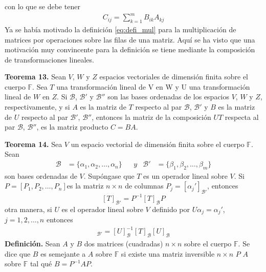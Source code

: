 \newpage
con lo que se debe tener
\begin{align}\label{eq:defi_mul}
    C_{ij}=\sum_{k=1}^{m}B_{ik}A_{kj}
\end{align}
Ya se había motivado la deﬁnición \eqref{eq:defi_mul} para la
multiplicación de matrices por operaciones sobre las ﬁlas de
una matriz. Aquí se ha visto que una motivación muy convincente
para la deﬁnición se tiene mediante la composición de
transformaciones lineales.

\textbf{Teorema 13.} Sean $V$, $W$ y $Z$ espacios vectoriales de
dimensión finita sobre el cuerpo $\mathbb{F}$. Sea $T$ una
transformación lineal de V en W y U una transformación lineal
de $W$ en $Z$. Si $\mathcal{B}$, $\mathcal{B}'$ y $\mathcal{B}''$
son las bases ordenadas de los espacios $V$, $W$ y $Z$,
respectivamente, y si $A$ es la matriz de $T$ respecto al par
$\mathcal{B}$, $\mathcal{B}'$ y $B$ es la matriz de $U$ respecto
al par $\mathcal{B}'$, $\mathcal{B}''$, entonces la matriz de
la composición $UT$ respecta al par $\mathcal{B}$, $\mathcal{B}''$,
es la matriz producto $C = BA$.

\textbf{Teorema 14.} Sea $V$ un espacio vectorial de dimensión finita
sobre el cuerpo $\mathbb{F}$. Sean
\begin{align*}
    \mathcal{B}   &= \{\alpha_{1}, \alpha_{2}, \dots , \alpha_{n}\}&&y&
    \mathcal{B}'  &= \{\beta_{1}, \beta_{2}, \dots ,\beta_{m}\}
\end{align*}
son bases ordenadas de $V$. Supóngase que $T$ es un operador lineal
sobre $V$. Si $P=[P_{1}, P_{2},\dots, P_{n}]$es la matriz $n \times n$
de columnas $P_{j}=[\alpha_{j}']_{\mathcal{B}'}$, entonces
$$[T]_{\mathcal{B}'} = P^{-1}[T]_{\mathcal{B}}P$$
otra manera, si $U$ es el operador lineal sobre $V$ definido por
$U\alpha_{j}=\alpha_{j}'$, $j=1,2,\dots, n$ entonces
\begin{align*}
    [T]_{\mathcal{B}'} = [U]_{\mathcal{B}}^{-1} [T]_{\mathcal{B}}[U]_{\mathcal{B}}
\end{align*}
\textbf{Deﬁnición.} Sean $A$ y $B$ dos matrices (cuadradas) $n \times n$
sobre el cuerpo $\mathbb{F}$. Se dice que $B$ es semejante a $A$ sobre
$\mathbb{F}$ si existe una matriz inversible  $n \times n$ $P$ $A$ sobre
$\mathbb{F}$ tal qué $B = P^{-1}AP$.
